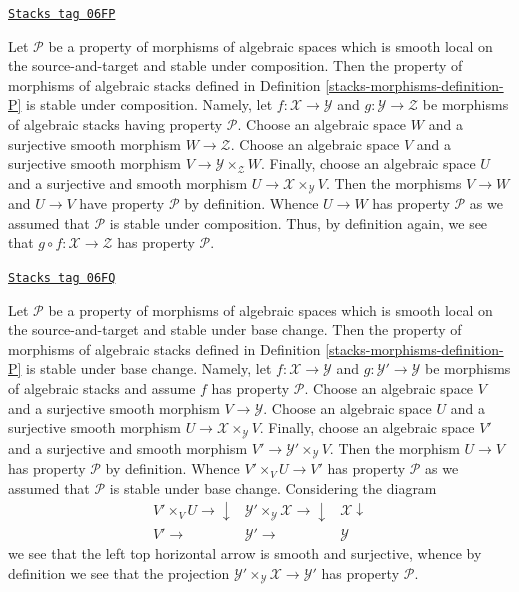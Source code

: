 \begin{remark}[Composition]
\label{stacks-morphisms-remark-composition}
\href{https://stacks.math.columbia.edu/tag/06FP}{\texttt{Stacks tag 06FP}}

Let $\mathcal{P}$ be a property of morphisms of algebraic spaces
which is smooth local on the source-and-target and stable under composition.
Then the property of morphisms of algebraic stacks defined in
Definition \ref{stacks-morphisms-definition-P}
is stable under composition. Namely, let $f : \mathcal{X} \to \mathcal{Y}$
and $g : \mathcal{Y} \to \mathcal{Z}$ be morphisms of algebraic stacks
having property $\mathcal{P}$. Choose an algebraic space $W$ and a
surjective smooth morphism $W \to \mathcal{Z}$. Choose an algebraic space
$V$ and a surjective smooth morphism $V \to \mathcal{Y} \times_\mathcal{Z} W$.
Finally, choose an algebraic space $U$ and a surjective and smooth morphism
$U \to \mathcal{X} \times_\mathcal{Y} V$. Then the morphisms
$V \to W$ and $U \to V$ have property $\mathcal{P}$ by definition.
Whence $U \to W$ has property $\mathcal{P}$ as we assumed that
$\mathcal{P}$ is stable under composition. Thus, by definition again,
we see that $g \circ f : \mathcal{X} \to \mathcal{Z}$ has
property $\mathcal{P}$.
\end{remark}

\begin{remark}
\label{stacks-morphisms-remark-base-change}
\href{https://stacks.math.columbia.edu/tag/06FQ}{\texttt{Stacks tag 06FQ}}

Let $\mathcal{P}$ be a property of morphisms of algebraic spaces
which is smooth local on the source-and-target and stable under base change.
Then the property of morphisms of algebraic stacks defined in
Definition \ref{stacks-morphisms-definition-P}
is stable under base change. Namely, let $f : \mathcal{X} \to \mathcal{Y}$
and $g : \mathcal{Y}' \to \mathcal{Y}$ be morphisms of algebraic stacks
and assume $f$ has property $\mathcal{P}$. Choose an algebraic space $V$
and a surjective smooth morphism $V \to \mathcal{Y}$. Choose an algebraic
space $U$ and a surjective smooth morphism
$U \to \mathcal{X} \times_\mathcal{Y} V$. Finally, choose an algebraic space
$V'$ and a surjective and smooth morphism
$V' \to \mathcal{Y}' \times_\mathcal{Y} V$. Then the morphism
$U \to V$ has property $\mathcal{P}$ by definition.
Whence $V' \times_V U \to V'$ has property $\mathcal{P}$ as we assumed that
$\mathcal{P}$ is stable under base change. Considering the diagram
$$
\begin{array}{ccc}V' \times_V U \longrightarrow\downarrow & \mathcal{Y}' \times_\mathcal{Y} \mathcal{X} \longrightarrow\downarrow & \mathcal{X} \downarrow \\ V' \longrightarrow & \mathcal{Y}' \longrightarrow & \mathcal{Y}\end{array}
$$
we see that the left top horizontal arrow is smooth and surjective,
whence by definition we see that the projection
$\mathcal{Y}' \times_\mathcal{Y} \mathcal{X} \to \mathcal{Y}'$ has
property $\mathcal{P}$.
\end{remark}

